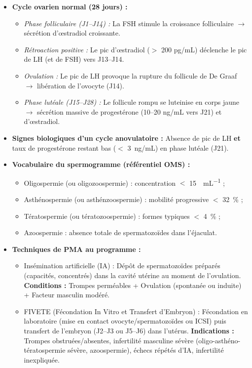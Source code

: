 \documentclass[11pt]{article}
\newcommand{\cle}[1]{{\popxbold\color{popdark}#1}}
\begin{document}
\begin{aretenir}
\begin{itemize}
\item \textbf{Cycle ovarien normal (28 jours) :} 
      \begin{itemize}
      \item \textit{Phase folliculaire (J1--J14) :} La FSH stimule la croissance folliculaire $\rightarrow$ sécrétion d'{\oe}stradiol croissante.
      \item \textit{Rétroaction positive :} Le pic d'{\oe}stradiol ($>$ 200 pg/mL) déclenche le \cle{pic de LH} (et de FSH) vers J13--J14.
      \item \textit{Ovulation :} Le pic de LH provoque la rupture du follicule de De Graaf $\rightarrow$ libération de l'ovocyte (J14).
      \item \textit{Phase lutéale (J15--J28) :} Le follicule rompu se luteinise en \cle{corps jaune} $\rightarrow$ sécrétion massive de \cle{progestérone} (10--20 ng/mL vers J21) et d'{\oe}stradiol.
      \end{itemize}
\item \textbf{Signes biologiques d'un cycle anovulatoire :} Absence de pic de LH \textbf{et} taux de progestérone restant bas ($<$ \SI{3}{ng/mL}) en phase lutéale (J21).
\item \textbf{Vocabulaire du spermogramme (référentiel OMS) :} 
      \begin{itemize}
      \item \cle{Oligospermie} (ou oligozoospermie) : concentration $<$ \SI{15}{\million\per\mL} ;
      \item \cle{Asthénospermie} (ou asthénzoospermie) : mobilité progressive $<$ \SI{32}{\%} ;
      \item \cle{Tératospermie} (ou tératozoospermie) : formes typiques $<$ \SI{4}{\%} ;
      \item \cle{Azoospermie} : absence totale de spermatozoïdes dans l'éjaculat.
      \end{itemize}
\item \textbf{Techniques de PMA au programme :}
      \begin{itemize}
      \item \cle{Insémination artificielle (IA)} : Dépôt de spermatozoïdes préparés (capacités, concentrés) dans la cavité utérine au moment de l'ovulation. \textbf{Conditions :} Trompes perméables + Ovulation (spontanée ou induite) + Facteur masculin modéré.
      \item \cle{FIVETE (Fécondation In Vitro et Transfert d'Embryon)} : Fécondation en laboratoire (mise en contact ovocyte/spermatozoïdes ou ICSI) puis transfert de l'embryon (J2--J3 ou J5--J6) dans l'utérus. \textbf{Indications :} Trompes obstruées/absentes, infertilité masculine sévère (oligo-asthéno-tératospermie sévère, azoospermie), échecs répétés d'IA, infertilité inexpliquée.

\end{itemize}
\end{itemize}
\end{aretenir}
\end{document}
